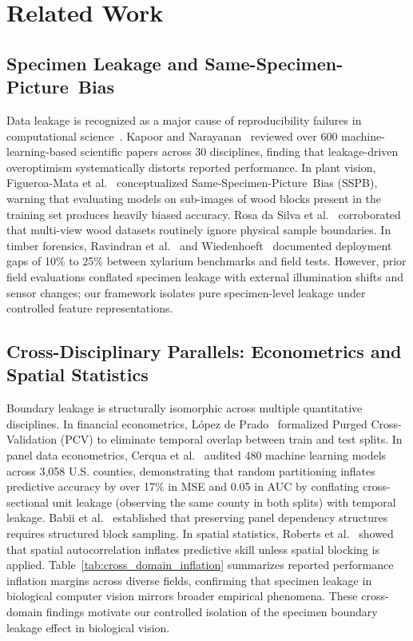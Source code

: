 \documentclass[a4paper,fleqn]{cas-sc}
\begin{document}
\section{Related Work}
\label{sec:related}

\subsection{Specimen Leakage and \mbox{Same-Specimen-Picture Bias}}
Data leakage is recognized as a major cause of reproducibility failures in computational science~\cite{kaufman2012,kapoor2023}. Kapoor and Narayanan~\cite{kapoor2023} reviewed over 600 machine-learning-based scientific papers across 30 disciplines, finding that leakage-driven overoptimism systematically distorts reported performance. In plant vision, Figueroa-Mata et al.~\cite{figueroamata2022} conceptualized \mbox{Same-Specimen-Picture Bias} (SSPB), warning that evaluating models on sub-images of wood blocks present in the training set produces heavily biased accuracy. Rosa da Silva et al.~\cite{rosadasilva2022} corroborated that multi-view wood datasets routinely ignore physical sample boundaries. In timber forensics, Ravindran et al.~\cite{ravindran2019,ravindran2021,ravindran2022} and Wiedenhoeft~\cite{wiedenhoeft2011} documented deployment gaps of 10\% to 25\% between xylarium benchmarks and field tests. However, prior field evaluations conflated specimen leakage with external illumination shifts and sensor changes; our framework isolates pure specimen-level leakage under controlled feature representations.

\subsection{Cross-Disciplinary Parallels: Econometrics and Spatial Statistics}
Boundary leakage is structurally isomorphic across multiple quantitative disciplines. In financial econometrics, L{\'o}pez de Prado~\cite{lopezdeprado2018} formalized Purged Cross-Validation (PCV) to eliminate temporal overlap between train and test splits. In panel data econometrics, Cerqua et al.~\cite{cerqua2026} audited 480 machine learning models across 3,058 U.S. counties, demonstrating that random partitioning inflates predictive accuracy by over 17\% in MSE and 0.05 in AUC by conflating cross-sectional unit leakage (observing the same county in both splits) with temporal leakage. Babii et al.~\cite{babii2024} established that preserving panel dependency structures requires structured block sampling. In spatial statistics, Roberts et al.~\cite{roberts2017} showed that spatial autocorrelation inflates predictive skill unless spatial blocking is applied. Table~\ref{tab:cross_domain_inflation} summarizes reported performance inflation margins across diverse fields, confirming that specimen leakage in biological computer vision mirrors broader empirical phenomena. These cross-domain findings motivate our controlled isolation of the specimen boundary leakage effect in biological vision.
\end{document}
